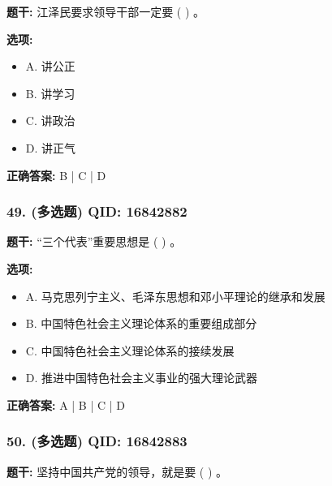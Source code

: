 \documentclass[12pt,UTF8]{ctexart}
\begin{document}
\textbf{题干:}
江泽民要求领导干部一定要 ( ) 。

\textbf{选项:}
\begin{itemize}[leftmargin=*]

  \item A. 讲公正

  \item B. 讲学习

  \item C. 讲政治

  \item D. 讲正气

\end{itemize}

\textbf{正确答案:}
B | C | D

\vspace{0.3em}\hrulefill\vspace{0.7em}

\subsubsection*{49. (多选题) \small QID: 16842882}

\textbf{题干:}
“三个代表”重要思想是 ( ) 。

\textbf{选项:}
\begin{itemize}[leftmargin=*]

  \item A. 马克思列宁主义、毛泽东思想和邓小平理论的继承和发展

  \item B. 中国特色社会主义理论体系的重要组成部分

  \item C. 中国特色社会主义理论体系的接续发展

  \item D. 推进中国特色社会主义事业的强大理论武器

\end{itemize}

\textbf{正确答案:}
A | B | C | D

\vspace{0.3em}\hrulefill\vspace{0.7em}

\subsubsection*{50. (多选题) \small QID: 16842883}

\textbf{题干:}
坚持中国共产党的领导，就是要 ( ) 。
\end{document}
